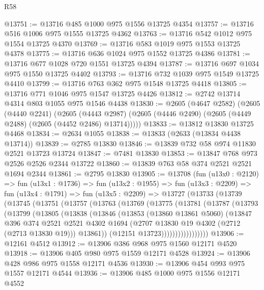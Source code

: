 \begin{lexlean}{R58}
\begin{coremodule}
@13751 := @13716 @485 @1000 @975 @1556 @13725 @4354
@13757 := @13716 @516 @1006 @975 @1555 @13725 @4362
@13763 := @13716 @542 @1012 @975 @1554 @13725 @4370
@13769 := @13716 @583 @1019 @975 @1553 @13725 @4378
@13775 := @13716 @636 @1024 @975 @1552 @13725 @4386
@13781 := @13716 @677 @1028 @720 @1551 @13725 @4394
@13787 := @13716 @697 @1034 @975 @1550 @13725 @4402
@13793 := @13716 @732 @1039 @975 @1549 @13725 @4410
@13799 := @13716 @763 @362 @975 @1548 @13725 @4418
@13805 := @13716 @771 @1046 @975 @1547 @13725 @4426
@13812 := @2742 @13714 @4314 @803 @1055 @975 @1546 @4438
@13830 := @2605
    (@4647 @2582)
    (@2605
      (@4440 @2241)
      (@2605
        (@4443 @2987)
        (@2605 (@4446 @2490) (@2605 (@4449 @2488) (@2605 (@4452 @2486) @13714)))))
@13833 := @13812 @13830 @13725 @4468
@13834 := @2634 @1055
@13838 := @13833 (@2633 (@13834 @4438 @13714))
@13839 := @2785 @13830
@13846 := @13839 @732 @58 @974 @11830 @2521 @13723 @13724
@13847 := @7481 @13830
@13853 := @13847 @768 @973 @2526 @2526 @2344 @13722
@13860 := @13839 @763 @58 @374 @2521 @2521 @1694 @2344
@13861 := @2795 @13830
@13905 := @13708
    (fun (u13x0 : @2120) =>
    fun (u13x1 : @1736) =>
    fun (u13x2 : @1955) =>
    fun (u13x3 : @2209) =>
    fun (u13x4 : @1791) =>
    fun (u13x5 : @2209) =>
    @13727
      (@13733
        (@13739
          (@13745
            (@13751
              (@13757
                (@13763
                  (@13769
                    (@13775
                      (@13781
                        (@13787
                          (@13793
                            (@13799
                              (@13805
                                (@13838
                                  (@13846
                                    (@13853
                                      (@13860 @13861 @5060)
                                      (@13847
                                        @396
                                        @374
                                        @2521
                                        @2521
                                        @4302
                                        @1694
                                        (@2707 @13830 @19 @4302 (@2712 (@2713 @13830 @19)))
                                        @13861))
                                    (@12151 @13723)))))))))))))))))
@13906 := @12161 @4512
@13912 := @13906 @386 @968 @975 @1560 @12171 @4520
@13918 := @13906 @405 @980 @975 @1559 @12171 @4528
@13924 := @13906 @428 @986 @975 @1558 @12171 @4536
@13930 := @13906 @454 @993 @975 @1557 @12171 @4544
@13936 := @13906 @485 @1000 @975 @1556 @12171 @4552

\end{coremodule}
\end{lexlean}
